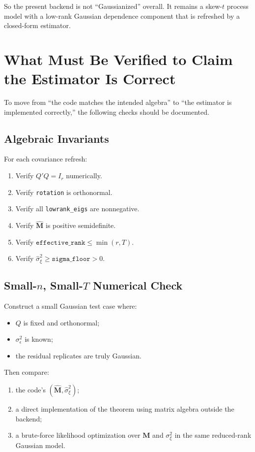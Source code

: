 \documentclass[11pt]{article}
\newcommand{\bM}{\mathbf{M}}
\begin{document}
So the present backend is not ``Gaussianized'' overall. It remains a skew-$t$
process model with a low-rank Gaussian dependence component that is refreshed by
a closed-form estimator.

\section{What Must Be Verified to Claim the Estimator Is Correct}

To move from ``the code matches the intended algebra'' to ``the estimator is
implemented correctly,'' the following checks should be documented.

\subsection{Algebraic Invariants}

For each covariance refresh:

\begin{enumerate}[label=\arabic*.]
\item Verify \(Q'Q = I_r\) numerically.
\item Verify \texttt{rotation} is orthonormal.
\item Verify all \texttt{lowrank\_eigs} are nonnegative.
\item Verify \(\widehat{\bM}\) is positive semidefinite.
\item Verify \(\texttt{effective\_rank} \le \min(r, T)\).
\item Verify \(\widehat{\sigma}_\xi^2 \ge \texttt{sigma\_floor} > 0\).
\end{enumerate}

\subsection{Small-\texorpdfstring{$n$}{n}, Small-\texorpdfstring{$T$}{T} Numerical Check}

Construct a small Gaussian test case where:

\begin{itemize}
\item \(Q\) is fixed and orthonormal;
\item \(\sigma_\epsilon^2\) is known;
\item the residual replicates are truly Gaussian.
\end{itemize}

Then compare:

\begin{enumerate}[label=\arabic*.]
\item the code's \((\widehat{\bM}, \widehat{\sigma}_\xi^2)\);
\item a direct implementation of the theorem using matrix algebra outside the
backend;
\item a brute-force likelihood optimization over \(\bM\) and
\(\sigma_\xi^2\) in the same reduced-rank Gaussian model.
\end{enumerate}
\end{document}
